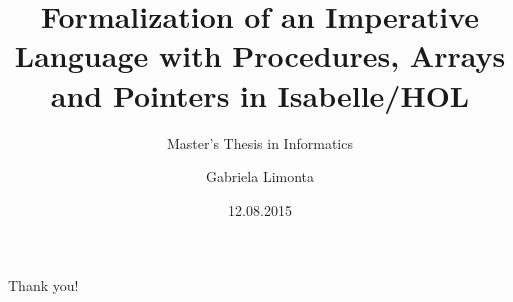 \documentclass{beamer}
\title{Formalization of an Imperative Language with Procedures, Arrays and Pointers in Isabelle/HOL}
\subtitle{Master's Thesis in Informatics}
\author{Gabriela Limonta}
\institute[]{Department of Informatics, Technische Universität München}
\date{12.08.2015}
\newcommand\Fontbi{\fontsize{12}{10}\selectfont}
\begin{document}
\begin{frame}
\titlepage
\end{frame}









\begin{frame}

\Fontbi

\begin{center}
Thank you!
\end{center}
\end{frame}
\end{document}
